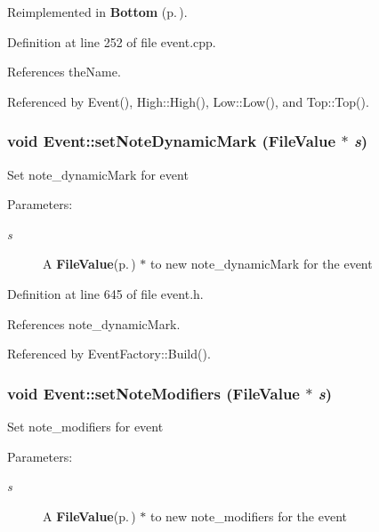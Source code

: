 Reimplemented in {\bf Bottom} {\rm (p.\,\pageref{classBottom_a6})}.

Definition at line 252 of file event.cpp.

References the\-Name.

Referenced by Event(), High::High(), Low::Low(), and Top::Top().
\subsubsection{\setlength{\rightskip}{0pt plus 5cm}void Event::set\-Note\-Dynamic\-Mark ({\bf File\-Value} $\ast$ {\em s})\hspace{0.3cm}{\tt  [inline]}}\label{classEvent_a79}


Set note\_\-dynamic\-Mark for event \begin{Desc}
\item[Parameters:]
\begin{description}
\item[{\em s}]A {\bf File\-Value}{\rm (p.\,\pageref{classFileValue})} $\ast$ to new note\_\-dynamic\-Mark for the event \end{description}
\end{Desc}


Definition at line 645 of file event.h.

References note\_\-dynamic\-Mark.

Referenced by Event\-Factory::Build().
\subsubsection{\setlength{\rightskip}{0pt plus 5cm}void Event::set\-Note\-Modifiers ({\bf File\-Value} $\ast$ {\em s})\hspace{0.3cm}{\tt  [inline]}}\label{classEvent_a81}


Set note\_\-modifiers for event \begin{Desc}
\item[Parameters:]
\begin{description}
\item[{\em s}]A {\bf File\-Value}{\rm (p.\,\pageref{classFileValue})} $\ast$ to new note\_\-modifiers for the event \end{description}
\end{Desc}


